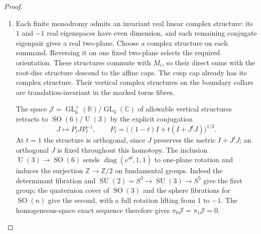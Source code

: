 \begin{proof}
\begin{enumerate}[label={$\langle1\rangle$\arabic*.}]
These ranks determine the cohomology: $H^0$ of the image sheaf is
$\mathbb Q$ in coefficient degree one, $H^1$ is $\mathbb Q^3$ in
coefficient degree three, and every other entry in these four
coefficient degrees is zero. The cusp skyscraper kernel adds
$\mathbb Q$ to $H^0(R^4\pi_*\mathbb Q)$ and no higher cohomology.
Connected fibres give $R^0\pi_*\mathbb Q=\mathbb Q$.

In the Leray sequence
\cite[Tag 01F2, Lemma 20.13.4; chapter PDF p.~22]{StacksProject},
the only remaining low-degree differential is
$d_2^{0,1}:\mathbb Q\to\mathbb Q$. Its kernel is $H^1(M;\mathbb Q)=0$
by Step~2, so it is an isomorphism. Hence
$b_1=b_2=b_3=0$ and $b_4=3+1=4$. Poincar\'e duality determines all
remaining Betti numbers and gives \eqref{maps:eq:F.5}. Also, the
smooth and finite quotient fibres have Euler number zero, while the
Kuhn cusp has Euler number six by Theorem~\ref{night:P1.9}. Additivity
over the base strata therefore gives $\chi(M)=6$ directly.

\item Each finite monodromy admits an invariant real linear complex
structure: its $1$ and $-1$ real eigenspaces have even dimension, and
each remaining conjugate eigenpair gives a real two-plane. Choose
a complex structure on each summand. Reversing it on one fixed
two-plane selects the required orientation. These structures commute
with $M_i$, so their direct sums with the root-disc structure descend
to the affine caps. The cusp cap already has its complex
structure. Their vertical complex structures on the boundary collars
are translation-invariant in the marked torus fibres.

The space $\mathcal J=\operatorname{GL}_6^+(\mathbb R)/
\operatorname{GL}_3(\mathbb C)$ of allowable vertical structures
retracts to $\operatorname{SO}(6)/\operatorname{U}(3)$ by the explicit
conjugation
\[
 J\longmapsto P_tJP_t^{-1},
 \qquad P_t=\bigl((1-t)I+t(I+J^tJ)\bigr)^{1/2}.
\]
At $t=1$ the structure is orthogonal, since $J$ preserves the metric
$I+J^tJ$; an orthogonal $J$ is fixed throughout this homotopy.
The inclusion $\operatorname{U}(3)\to\operatorname{SO}(6)$ sends
$\operatorname{diag}(e^{i\theta},1,1)$ to one-plane rotation and
induces the surjection $\mathbb Z\to\mathbb Z/2$ on fundamental
groups. Indeed the determinant fibration and
$\operatorname{SU}(2)=S^3\to\operatorname{SU}(3)\to S^5$ give the
first group; the quaternion cover of $\operatorname{SO}(3)$ and
the sphere fibrations for $\operatorname{SO}(n)$ give the second,
with a full rotation lifting from $1$ to $-1$. The homogeneous-space
exact sequence therefore gives $\pi_0\mathcal J=\pi_1\mathcal J=0$.


\end{enumerate}
\end{proof}
